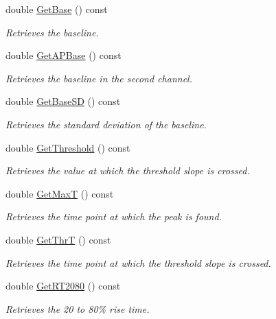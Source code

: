 \begin{DoxyCompactItemize}
double \hyperlink{classRecording_a71acc241d3c282fde919c8e710876541}{GetBase} () const 
\begin{DoxyCompactList}\small\item\em Retrieves the baseline. \item\end{DoxyCompactList}\item 
double \hyperlink{classRecording_a5d302113fe4b37e0ab373278f3a6d618}{GetAPBase} () const 
\begin{DoxyCompactList}\small\item\em Retrieves the baseline in the second channel. \item\end{DoxyCompactList}\item 
double \hyperlink{classRecording_ae8860f078ef8c5c19f38c234c9690819}{GetBaseSD} () const 
\begin{DoxyCompactList}\small\item\em Retrieves the standard deviation of the baseline. \item\end{DoxyCompactList}\item 
double \hyperlink{classRecording_a60b49830249c73a6d8267b94afcc7fbb}{GetThreshold} () const 
\begin{DoxyCompactList}\small\item\em Retrieves the value at which the threshold slope is crossed. \item\end{DoxyCompactList}\item 
double \hyperlink{classRecording_aa9cf83f451504c4a9a87f3385046ce0a}{GetMaxT} () const 
\begin{DoxyCompactList}\small\item\em Retrieves the time point at which the peak is found. \item\end{DoxyCompactList}\item 
double \hyperlink{classRecording_aa01a720786fb4f989008f8565d98bda0}{GetThrT} () const 
\begin{DoxyCompactList}\small\item\em Retrieves the time point at which the threshold slope is crossed. \item\end{DoxyCompactList}\item 
double \hyperlink{classRecording_ad02ba9ecca6c9559c64748b980cd51ef}{GetRT2080} () const 
\begin{DoxyCompactList}\small\item\em Retrieves the 20 to 80\% rise time. \item\end{DoxyCompactList}\item 

\end{DoxyCompactItemize}

